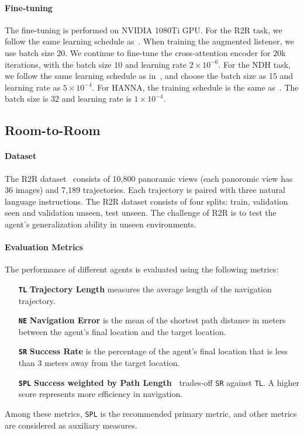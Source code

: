 \documentclass[10pt,twocolumn,letterpaper]{article}
\begin{document}
\paragraph{Fine-tuning} The fine-tuning is performed on NVIDIA 1080Ti GPU.
For the R2R task, we follow the same learning schedule as~\cite{tan2019learning}. When training the augmented listener, we use batch size 20. We continue to fine-tune the cross-attention encoder for 20k iterations, with the batch size 10 and learning rate $2\!\times\!10^{-6}$. 
For the NDH task, we follow the same learning schedule as in~\cite{thomason2019vision}, and choose the batch size as 15 and learning rate as $5\!\times\!10^{-4}$. 
For HANNA, the training schedule is the same as~\cite{nguyen2019help}. The batch size is 32 and learning rate is $1\!\times\!10^{-4}$. 



\subsection{Room-to-Room}
\paragraph{Dataset} The R2R dataset~\cite{anderson2018vision} consists of 10,800 panoramic views (each panoromic view has 36 images) and 7,189 trajectories. Each trajectory is paired with three natural language instructions. The R2R dataset consists of four splits: train, validation seen and validation unseen, test unseen. The challenge of R2R is to test the agent's generalization ability in unseen environments. 


\paragraph{Evaluation Metrics}
The performance of different agents is evaluated using the following metrics:
\begin{itemize}[noitemsep,topsep=2pt] \item[\textbf{\texttt{TL}}] \textbf{Trajectory Length} measures the average length of the navigation trajectory.
\item[\textbf{\texttt{NE}}] \textbf{Navigation Error} is the mean of the shortest path distance in meters between the agent's final location and the target location. 
\item[\textbf{\texttt{SR}}] \textbf{Success Rate} is the percentage of the agent's final location that is less than 3 meters away from the target location.
\item[\textbf{\texttt{SPL}}] \textbf{Success weighted by Path Length~\cite{anderson2018evaluation}} trades-off \texttt{SR} against \texttt{TL}. A higher score represents more efficiency in navigation.
\end{itemize}
Among these metrics, \texttt{SPL} is the recommended primary metric, and other metrics are considered as auxiliary measures.
\end{document}
